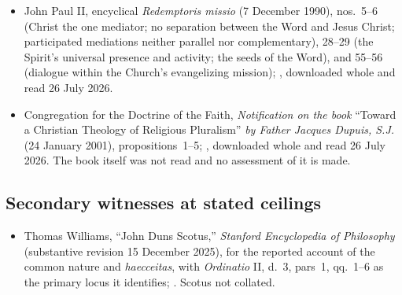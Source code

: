 {\fontsize{8.6}{9.6}\selectfont
\begin{itemize}[itemsep=0pt,parsep=0pt,topsep=0.05em]
\item John Paul II, encyclical \emph{Redemptoris missio} (7 December 1990), nos.~5--6 (Christ the one mediator; no separation between the Word and Jesus Christ; participated mediations neither parallel nor complementary), 28--29 (the Spirit's universal presence and activity; the seeds of the Word), and 55--56 (dialogue within the Church's evangelizing mission); , downloaded whole and read 26 July 2026.
\item Congregation for the Doctrine of the Faith, \emph{Notification on the book} ``Toward a Christian Theology of Religious Pluralism'' \emph{by Father Jacques Dupuis, S.J.} (24 January 2001), propositions~1--5; , downloaded whole and read 26 July 2026. The book itself was not read and no assessment of it is made.
\end{itemize}}

\subsection*{Secondary witnesses at stated ceilings}

{\fontsize{8.6}{9.6}\selectfont
\begin{itemize}[itemsep=0pt,parsep=0pt,topsep=0.05em]
\item Thomas Williams, ``John Duns Scotus,'' \emph{Stanford Encyclopedia of Philosophy} (substantive revision 15 December 2025), for the reported account of the common nature and \emph{haecceitas}, with \emph{Ordinatio} II, d.~3, pars~1, qq.~1--6 as the primary locus it identifies; . Scotus not collated.
\end{itemize}}

\endgroup
